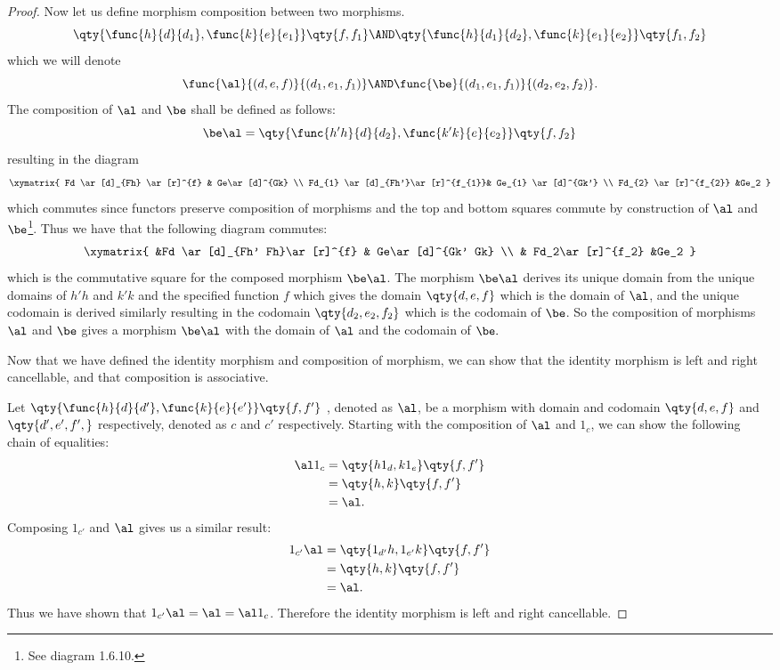 \documentclass[main.tex]{subfiles}
\begin{document}
\begin{proof}
	Now let us define morphism composition between two morphisms.
	$$\qty{\func{h}{d}{d_1},\func{k}{e}{e_1}} \qty{f,f_1} \AND
	\qty{\func{h}{d_1}{d_2},\func{k}{e_1}{e_2}} \qty{f_1,f_2}$$ which we will
	denote $$\func{\al}{(d,e,f)}{(d_1,e_1,f_1)} \AND
	\func{\be}{(d_1,e_1,f_1)}{(d_2,e_2,f_2)}.$$
	The composition of $\al$ and $\be$ shall be defined as follows:
	\[\be  \al=\qty{\func{h'  h}{d}{d_{2}},\func{k'  k}{e}{e_{2}}}\qty{f,f_2}\]
	resulting in the diagram
	\[\xymatrix{ Fd \ar[d]_{Fh} \ar[r]^{f} & Ge\ar[d]^{Gk}  \\
			Fd_{1} \ar[d]_{Fh'}\ar[r]^{f_{1}}& Ge_{1} \ar[d]^{Gk'} \\
	Fd_{2} \ar[r]^{f_{2}} &Ge_2 } \]
	which commutes since functors preserve composition of morphisms and the top
	and bottom squares commute by construction of $\al$ and $\be$\footnote{See diagram 1.6.10.}. Thus we have
	that the following diagram commutes:
	\[\xymatrix{ &Fd \ar[d]_{Fh'  Fh}\ar[r]^{f} & Ge\ar[d]^{Gk' Gk}
			 \\  & Fd_2\ar[r]^{f_2} &Ge_2 }\]
	which is the commutative square for the composed morphism $\be  \al$.
	The morphism $\be \al$ derives its unique domain from the unique
	domains of $h' h$ and $k' k$ and the specified function $f$
	which gives the domain $\qty{d,e,f}$ which is the domain of $\al$, and the
	unique codomain is derived similarly resulting in the codomain
	$\qty{d_2,e_2,f_2}$ which is the codomain of $\be$. So the composition of
	morphisms $\al$ and $\be$ gives a morphism $\be \al$ with the domain
	of $\al$ and the codomain of $\be.$

	Now that we have defined the identity morphism and composition of morphism,
	we can show that the identity morphism is left and right cancellable, and
	that composition is associative.

	Let $\qty{\func{h}{d}{d'},\func{k}{e}{e'}} \qty{f,f'}$ , denoted as $\al$,
	be a morphism with domain and codomain $\qty{d,e,f}$ and $\qty{d',e',f',}$
	respectively, denoted as $c$ and $c'$ respectively. Starting with the
	composition of $\al$ and $1_{c}$, we can show the following chain of
	equalities:
	\begin{align*}
	\al  1_{c } &= \qty{h 1_{d},k 1_{e}}\qty{f,f'}\\
	&= \qty{h,k}\qty{f,f'} \\
	 &= \al.
	\end{align*}
	Composing  $1_{c'}$ and $\al$ gives us a similar result:
	\begin{align*}
	1_{c' } \al &= \qty{1_{d'} h, 1_{e'} k}\qty{f,f'}\\
	&= \qty{h,k}\qty{f,f'}\\
	&= \al.
	\end{align*}
	Thus we have shown
	that $1_{c' } \al = \al = \al 1_{c}$. Therefore the identity
	morphism is left and right cancellable.


\end{proof}
\end{document}
